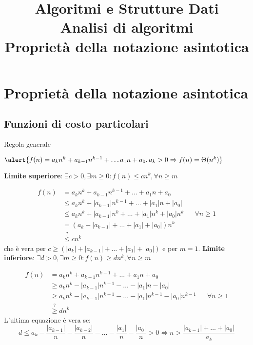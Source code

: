 \title[ASD - Analisi di algoritmi]{\textbf{Algoritmi e Strutture Dati}\\[18pt]Analisi di algoritmi\\Proprietà della notazione asintotica}

\FrameTitle{}

\section{Proprietà della notazione asintotica}

\subsection{Funzioni di costo particolari}
\begin{frame}{Regola generale}

\begin{myboxtitle}
$
  \alert{f(n) = a_k n^k + a_{k-1}n^{k-1} + \ldots a_1 n + a_0, a_k >0 \Rightarrow f(n) = \Theta(n^k)}  
$
\end{myboxtitle}

\begin{overprint}
\textbf{Limite superiore}: $\exists c>0, \exists m \geq 0: f(n) \leq cn^k, \forall n \geq m$

\begin{align*}
f(n) &= a_kn^k + a_{k-1}n^{k-1} +  \ldots  + a_1n + a_0 \\
     &\leq a_kn^k + |a_{k-1}|n^{k-1} +  \ldots  + |a_1|n + |a_0| \\
     &\leq a_kn^k + |a_{k-1}|n^k +  \ldots  + |a_1|n^k + |a_0|n^k && \forall n \geq 1\\
     &= (a_k + |a_{k-1}| +  \ldots  + |a_1| + |a_0|)n^k \\
     &\stackrel{?}{\leq} cn^k
\end{align*}
che è vera per $c \geq (|a_k| + |a_{k-1}| +  \ldots  + |a_1| + |a_0|)$ e per $m = 1$.
\textbf{Limite inferiore}: $\exists d>0, \exists m \geq 0: f(n) \geq dn^k, \forall n \geq m$

\begin{align*}
f(n) &= a_kn^k + a_{k-1}n^{k-1} +  \ldots  + a_1n + a_0 \\
     &\geq a_kn^k - |a_{k-1}|n^{k-1} - \ldots  - |a_1|n - |a_0| \\
     &\geq a_kn^k - |a_{k-1}|n^{k-1} - \ldots  - |a_1|n^{k-1} - |a_0|n^{k-1} && \forall n \geq 1\\
     &\stackrel{?}{\geq} dn^k
\end{align*}
L'ultima equazione è vera se:
\[
  d \leq a_k - \frac{|a_{k-1}|}{n} - \frac{|a_{k-2}|}{n} -\ldots  - \frac{|a_1|}{n} - \frac{|a_0|}{n} > 0 \Leftrightarrow 
  n > \frac{|a_{k-1}| + \ldots + | a_0 |}{a_k}
\]
\end{overprint}
\end{frame}

